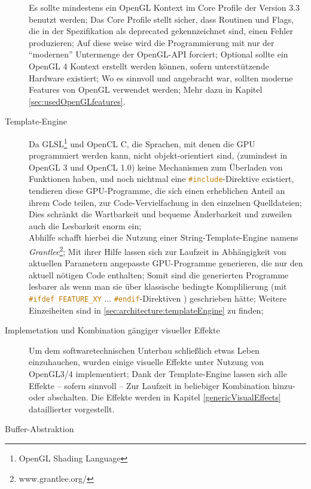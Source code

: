 \begin{description}
	Es sollte mindestens ein OpenGL Kontext im Core Profile der Version 3.3 benutzt werden; Das Core Profile stellt sicher,
	dass Routinen und Flags, die in der Spezifikation als deprecated gekennzeichnet sind, einen Fehler produzieren;
	Auf diese weise wird die Programmierung mit nur der "`modernen"' Untermenge der OpenGL-API forciert;
	Optional sollte ein OpenGL 4 Kontext erstellt werden können, sofern unterstützende Hardware existiert;
	Wo es sinnvoll und angebracht war, sollten moderne Features von OpenGL verwendet werden;
	Mehr dazu in Kapitel \ref{sec:usedOpenGLfeatures}.

	
	\item[Template-Engine]
	Da GLSL\footnote{OpenGL Shading Language} und OpenCL C, die Sprachen, mit denen die GPU programmiert werden kann,
	nicht objekt-orientiert sind, (zumindest in OpenGL 3 und OpenCL 1.0) keine Mechanismen zum Überladen von Funktionen
	haben, und noch nichtmal eine \linebreak \lstinline[language=C]|#include|-Direktive existiert,
	tendieren diese GPU-Programme, die sich einen erheblichen Anteil an ihrem Code teilen, zur Code-Vervielfachung in den 	
	einzelnen Quelldateien;
	Dies schränkt die Wartbarkeit und bequeme Änderbarkeit und zuweilen auch die Lesbarkeit enorm ein;\\
	Abhilfe schafft hierbei die Nutzung einer String-Template-Engine namens \emph{Grantlee}\footnote{www.grantlee.org/};
	Mit ihrer Hilfe lassen sich zur Laufzeit in Abhängigkeit von aktuellen Parametern angepasste GPU-Programme generieren,
	die nur den aktuell nötigen Code enthalten;
	Somit sind die generierten Programme lesbarer als wenn man sie über klassische bedingte Komplilierung 
	(mit \lstinline[language=C]|#ifdef FEATURE_XY| ... \lstinline[language=C]|#endif|-Direktiven ) geschrieben hätte;
	Weitere Einzeiheiten sind in \ref{sec:architecture:templateEngine} zu finden;

	
	\item[Implemetation und Kombination gängiger visueller Effekte]
	Um dem softwaretechnischen Unterbau schließlich etwas Leben einzuhauchen, wurden einige visuelle Effekte unter
	Nutzung von OpenGL3/4 implementiert; Dank der Template-Engine lassen sich alle Effekte -- sofern sinnvoll --
	Zur Laufzeit in beliebiger Kombination hinzu- oder abschalten.
	Die Effekte werden in Kapitel \ref{genericVisualEffects} dataillierter vorgestellt.
	

	\item[Buffer-Abstraktion]




\end{description}
